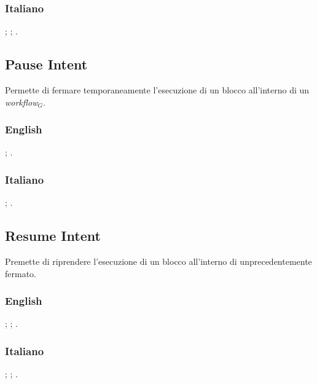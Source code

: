 \subsubsection{Italiano}
\begin{itemize}	
	;
	;
	.
	
\end{itemize}



\subsection{Pause Intent}
Permette di fermare temporaneamente l'esecuzione di un blocco all'interno di un \textit{workflow$_{G}$}.
\subsubsection{English}
\begin{itemize}
	
	;
	.
	
\end{itemize}

\subsubsection{Italiano}
\begin{itemize}
	
	;
	.
	
\end{itemize}


\subsection{Resume Intent}
Premette di riprendere l'esecuzione di un blocco all'interno di unprecedentemente fermato.
\subsubsection{English}
\begin{itemize}
	
	;
	;
	.
	
\end{itemize}

\subsubsection{Italiano}
\begin{itemize}
	;
	;
	.
	
\end{itemize}



